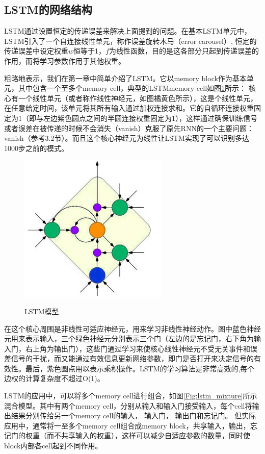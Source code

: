 \subsection{LSTM的网络结构}
LSTM通过设置恒定的传递误差来解决上面提到的问题。在基本LSTM单元中，LSTM引入了一个自连接线性单元，称作误差旋转木马（error carousel）, 恒定的传递误差中设定权重$w$恒等于1，$f$为线性函数，目的是这各部分只起到传递误差的作用，而将学习参数作用于其他权重。

粗略地表示，我们在第一章中简单介绍了LSTM。它以memory block作为基本单元，其中包含一个至多个memory cell，典型的LSTMmemory cell如图\ref{Fig:lstm_simple}所示：
核心有一个线性单元（或者称作线性神经元，如图橘黄色所示），这是个线性单元，在任意给定时间，该单元将其所有输入通过加权连接求和。它的自循环连接权重固定为1（即与左边紫色圆点之间的半圆连接权重固定为1），这样通过确保训练信号或者误差在被传递的时候不会消失（vanish）克服了原先RNN的一个主要问题：vanish（参考3.2节）。而且这个核心神经元为线性让LSTM实现了可以识别多达1000步之前的模式。


\begin{figure}[htb]
  \centering
  \includegraphics{Pictures/LSTM/lstm_simple.png}\\
  \caption{LSTM模型}\label{Fig:lstm_simple}
\end{figure}

在这个核心周围是非线性可适应神经元，用来学习非线性神经动作。图中蓝色神经元用来表示输入，三个绿色神经元分别表示三个门（左边的是忘记门，右下角为输入门，右上角为输出门），这些门通过学习来使核心线性神经元不受无关事件和误差信号的干扰，而又能通过有效信息更新网络参数，即门是否打开来决定信号的有效性。最后，紫色圆点用以表示乘积操作。LSTM的学习算法是非常高效的,每个边权的计算复杂度不超过O(1)。


LSTM的应用中，可以将多个memory cell进行组合，如图\ref{Fig:lstm_mixture}所示混合模型。其中有两个memory cell，分别从输入和输入门接受输入，每个cell将输出结果分别传给另一个memory cell的输入， 输入门， 输出门和忘记门。 但实际应用中，通常将一至多个memory cell组合成memory block，共享输入，输出，忘记门的权重（而不共享输入的权重），这样可以减少自适应参数的数量，同时使block内部各cell起到不同作用。 

